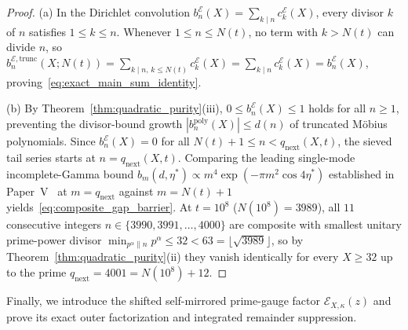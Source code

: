 \documentclass[11pt,reqno]{amsart}
\theoremstyle{definition}
\theoremstyle{remark}
\numberwithin{equation}{section}
\begin{document}
\begin{proof}
(a) In the Dirichlet convolution $b_n^{\mathcal{E}}(X) = \sum_{k \mid n} c_k^{\mathcal{E}}(X)$, every divisor $k$ of $n$ satisfies $1 \le k \le n$. Whenever $1 \le n \le N(t)$, no term with $k > N(t)$ can divide $n$, so $b_n^{\mathcal{E},\mathrm{trunc}}(X;N(t)) = \sum_{k \mid n,\, k \le N(t)} c_k^{\mathcal{E}}(X) = \sum_{k \mid n} c_k^{\mathcal{E}}(X) = b_n^{\mathcal{E}}(X)$, proving~\eqref{eq:exact_main_sum_identity}.

(b) By Theorem~\ref{thm:quadratic_purity}(iii), $0 \le b_n^{\mathcal{E}}(X) \le 1$ holds for all $n \ge 1$, preventing the divisor-bound growth $|b_n^{\mathrm{poly}}(X)| \le d(n)$ of truncated M\"obius polynomials. Since $b_n^{\mathcal{E}}(X) = 0$ for all $N(t)+1 \le n < q_{\mathrm{next}}(X,t)$, the sieved tail series starts at $n = q_{\mathrm{next}}(X,t)$. Comparing the leading single-mode incomplete-Gamma bound $b_m(d,\eta^*) \propto m^4\exp(-\pi m^2\cos 4\eta^*)$ established in Paper~V~\cite{missiaen2026paper5} at $m = q_{\mathrm{next}}$ against $m = N(t)+1$ yields~\eqref{eq:composite_gap_barrier}. At $t = 10^8$ ($N(10^8) = 3989$), all $11$ consecutive integers $n \in \{3990, 3991, \dots, 4000\}$ are composite with smallest unitary prime-power divisor $\min_{p^\alpha \parallel n} p^\alpha \le 32 < 63 = \lfloor\sqrt{3989}\rfloor$, so by Theorem~\ref{thm:quadratic_purity}(ii) they vanish identically for every $X \ge 32$ up to the prime $q_{\mathrm{next}} = 4001 = N(10^8) + 12$.
\end{proof}

Finally, we introduce the shifted self-mirrored prime-gauge factor $\mathcal{E}_{X,\kappa}(z)$ and prove its exact outer factorization and integrated remainder suppression.
\end{document}
